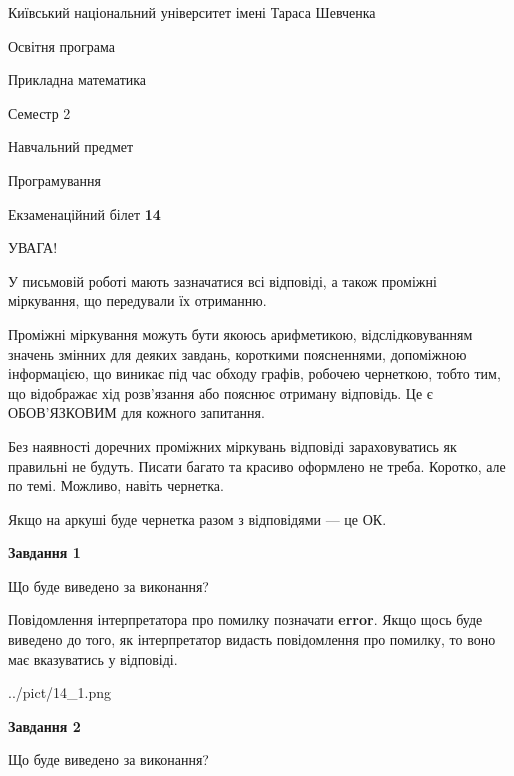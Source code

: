 \documentclass[12pt, ukrainian]{article}
\begin{document}
{{\begin {small}\par
{ \center  Київський національний університет імені Тараса Шевченка \par}
{\parbox {5 cm}{Освітня програма \hfill}{\parbox {7 cm}{Прикладна математика \hfill}}\parbox {6 cm}{\hfill Семестр 2}}\par
{\parbox {5 cm} {Навчальний предмет \hfill}\parbox {7 cm}{Програмування \hfill}\parbox {6cm}{\hfill}\par}\vspace{-7pt} \end{small}}{\center Екзаменаційний білет \No \textbf
{ 14 }\par}}
{
\begin {large}
УВАГА!

У письмовій роботі мають зазначатися всі відповіді, а також проміжні міркування, що передували їх отриманню.

Проміжні міркування можуть бути якоюсь арифметикою, відслідковуванням зна\-чень змінних для деяких завдань,
короткими поясненнями, допоміжною інформацією, що виникає під час обходу графів, робочею чернеткою,
тобто тим, що відображає хід розв’язання або пояснює отриману відповідь.
Це є ОБОВ’ЯЗКОВИМ для кожного запитання.

Без наявності доречних проміжних міркувань відповіді зараховуватись як правиль\-ні не будуть.
Писати багато та красиво оформлено не треба. Коротко, але по темі. Можли\-во, навіть чернетка.

Якщо на аркуші буде чернетка разом з відповідями --- це ОК.

\newpage

{\begin {center}\textbf{Завдання 1}\end {center}}\par
Що буде виведено за виконання?

Повідомлення інтерпретатора про помилку позначати \textbf{error}.
Якщо щось буде виведено до того, як інтерпретатор видасть повідомлення про помилку, 
то воно має вказуватись у відповіді. \par


\begin{center}
	{../pict/14_1.png}
\end{center}
\newpage

{\begin {center}\textbf{Завдання 2}\end {center}}\par
Що буде виведено за виконання?


\end{large}}
\end{document}
